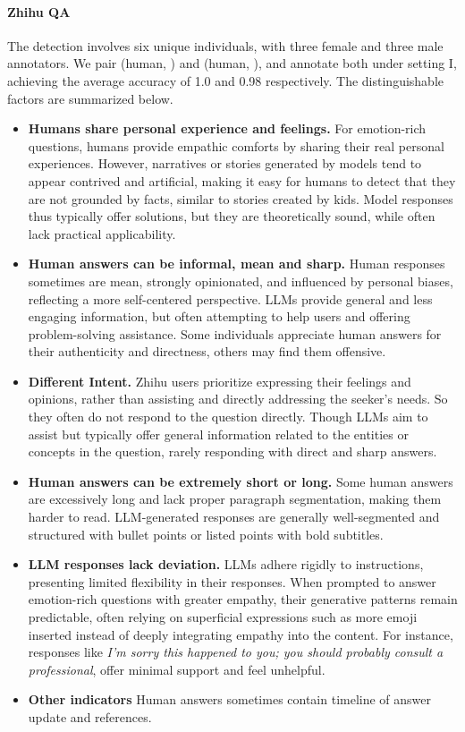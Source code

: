 \paragraph{Zhihu QA}
The detection involves six unique individuals, with three female and three male annotators. 
We pair (human, \gptfouro) and (human, \qwenturbo), and annotate both under setting I, achieving the average accuracy of 1.0 and 0.98 respectively. The distinguishable factors are summarized below.
\begin{itemize}
    \item \textbf{Humans share personal experience and feelings.} For emotion-rich questions, humans provide empathic comforts by sharing their real personal experiences. However, narratives or stories generated by models tend to appear contrived and artificial, making it easy for humans to detect that they are not grounded by facts, similar to stories created by kids. Model responses thus typically offer solutions, but they are theoretically sound, while often lack practical applicability.    
    
    \item \textbf{Human answers can be informal, mean and sharp.} 
    Human responses sometimes are mean, strongly opinionated, and influenced by personal biases, reflecting a more self-centered perspective. LLMs provide general and less engaging information, but often attempting to help users and offering problem-solving assistance. Some individuals appreciate human answers for their authenticity and directness, others may find them offensive.
    
    \item \textbf{Different Intent.} Zhihu users prioritize expressing their feelings and opinions, rather than assisting and directly addressing the seeker's needs. So they often do not respond to the question directly. Though LLMs aim to assist but typically offer general information related to the entities or concepts in the question, rarely responding with direct and sharp answers.
   
    \item \textbf{Human answers can be extremely short or long.} Some human answers are excessively long and lack proper paragraph segmentation, making them harder to read. LLM-generated responses are generally well-segmented and structured with bullet points or listed points with bold subtitles.

    \item \textbf{LLM responses lack deviation.} LLMs adhere rigidly to instructions, presenting limited flexibility in their responses. When prompted to answer emotion-rich questions with greater empathy, their generative patterns remain predictable, often relying on superficial expressions such as more emoji inserted instead of deeply integrating empathy into the content. For instance, responses like \textit{I'm sorry this happened to you; you should probably consult a professional}, offer minimal support and feel unhelpful.

    \item \textbf{Other indicators} Human answers sometimes contain timeline of answer update and references. 
\end{itemize}

